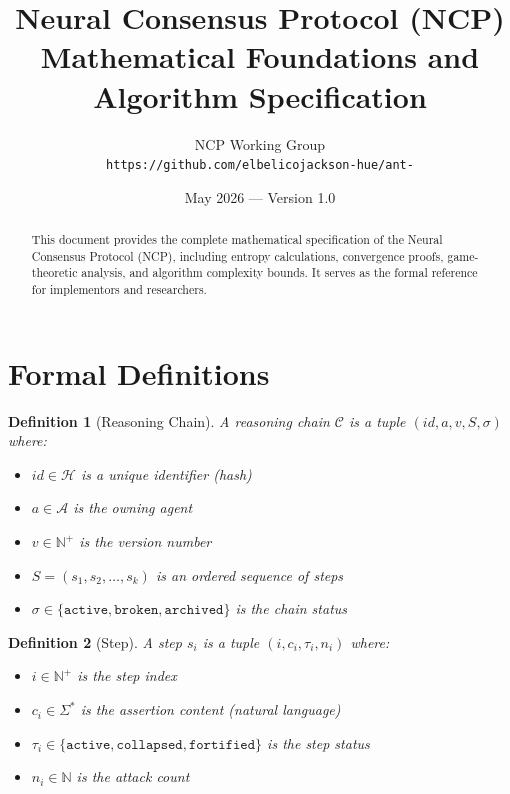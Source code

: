 \documentclass[11pt,a4paper]{article}
\title{\textbf{Neural Consensus Protocol (NCP)} \\ \Large Mathematical Foundations and Algorithm Specification}
\author{NCP Working Group \\ \texttt{https://github.com/elbelicojackson-hue/ant-}}
\date{May 2026 — Version 1.0}
\newtheorem{definition}{Definition}
\begin{document}
\maketitle

\begin{abstract}
This document provides the complete mathematical specification of the Neural Consensus Protocol (NCP), including entropy calculations, convergence proofs, game-theoretic analysis, and algorithm complexity bounds. It serves as the formal reference for implementors and researchers.
\end{abstract}

\tableofcontents
\newpage

\section{Formal Definitions}

\begin{definition}[Reasoning Chain]
A reasoning chain $\mathcal{C}$ is a tuple $(id, a, v, S, \sigma)$ where:
\begin{itemize}
    \item $id \in \mathcal{H}$ is a unique identifier (hash)
    \item $a \in \mathcal{A}$ is the owning agent
    \item $v \in \mathbb{N}^+$ is the version number
    \item $S = (s_1, s_2, \ldots, s_k)$ is an ordered sequence of steps
    \item $\sigma \in \{\texttt{active}, \texttt{broken}, \texttt{archived}\}$ is the chain status
\end{itemize}
\end{definition}

\begin{definition}[Step]
A step $s_i$ is a tuple $(i, c_i, \tau_i, n_i)$ where:
\begin{itemize}
    \item $i \in \mathbb{N}^+$ is the step index
    \item $c_i \in \Sigma^*$ is the assertion content (natural language)
    \item $\tau_i \in \{\texttt{active}, \texttt{collapsed}, \texttt{fortified}\}$ is the step status
    \item $n_i \in \mathbb{N}$ is the attack count
\end{itemize}
\end{definition}
\end{document}
